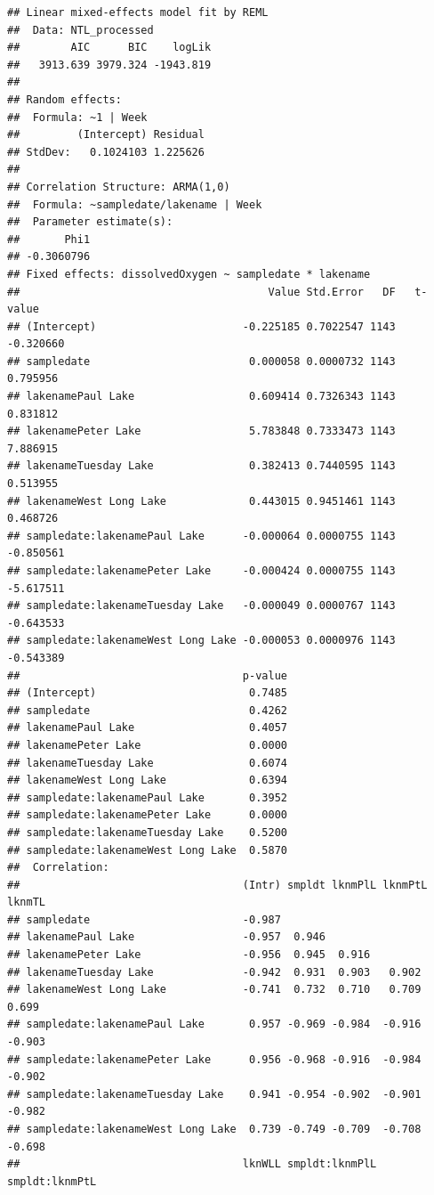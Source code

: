 \documentclass[12pt,]{article}
\begin{document}
\begin{verbatim}
## Linear mixed-effects model fit by REML
##  Data: NTL_processed 
##        AIC      BIC    logLik
##   3913.639 3979.324 -1943.819
## 
## Random effects:
##  Formula: ~1 | Week
##         (Intercept) Residual
## StdDev:   0.1024103 1.225626
## 
## Correlation Structure: ARMA(1,0)
##  Formula: ~sampledate/lakename | Week 
##  Parameter estimate(s):
##       Phi1 
## -0.3060796 
## Fixed effects: dissolvedOxygen ~ sampledate * lakename 
##                                       Value Std.Error   DF   t-value
## (Intercept)                       -0.225185 0.7022547 1143 -0.320660
## sampledate                         0.000058 0.0000732 1143  0.795956
## lakenamePaul Lake                  0.609414 0.7326343 1143  0.831812
## lakenamePeter Lake                 5.783848 0.7333473 1143  7.886915
## lakenameTuesday Lake               0.382413 0.7440595 1143  0.513955
## lakenameWest Long Lake             0.443015 0.9451461 1143  0.468726
## sampledate:lakenamePaul Lake      -0.000064 0.0000755 1143 -0.850561
## sampledate:lakenamePeter Lake     -0.000424 0.0000755 1143 -5.617511
## sampledate:lakenameTuesday Lake   -0.000049 0.0000767 1143 -0.643533
## sampledate:lakenameWest Long Lake -0.000053 0.0000976 1143 -0.543389
##                                   p-value
## (Intercept)                        0.7485
## sampledate                         0.4262
## lakenamePaul Lake                  0.4057
## lakenamePeter Lake                 0.0000
## lakenameTuesday Lake               0.6074
## lakenameWest Long Lake             0.6394
## sampledate:lakenamePaul Lake       0.3952
## sampledate:lakenamePeter Lake      0.0000
## sampledate:lakenameTuesday Lake    0.5200
## sampledate:lakenameWest Long Lake  0.5870
##  Correlation: 
##                                   (Intr) smpldt lknmPlL lknmPtL lknmTL
## sampledate                        -0.987                              
## lakenamePaul Lake                 -0.957  0.946                       
## lakenamePeter Lake                -0.956  0.945  0.916                
## lakenameTuesday Lake              -0.942  0.931  0.903   0.902        
## lakenameWest Long Lake            -0.741  0.732  0.710   0.709   0.699
## sampledate:lakenamePaul Lake       0.957 -0.969 -0.984  -0.916  -0.903
## sampledate:lakenamePeter Lake      0.956 -0.968 -0.916  -0.984  -0.902
## sampledate:lakenameTuesday Lake    0.941 -0.954 -0.902  -0.901  -0.982
## sampledate:lakenameWest Long Lake  0.739 -0.749 -0.709  -0.708  -0.698
##                                   lknWLL smpldt:lknmPlL smpldt:lknmPtL

\end{verbatim}
\end{document}
